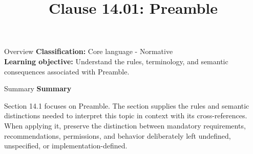 \documentclass[10pt,letterpaper]{article}
\title{Clause 14.01: Preamble}
\author{}
\date{}
\begin{document}
\maketitle
\begin{CornellOverviewBox}{Overview}
\textbf{Classification:} Core language - Normative\\[2pt]
\textbf{Learning objective:} Understand the rules, terminology, and semantic consequences associated with Preamble.
\end{CornellOverviewBox}\begin{CornellSummaryBox}{Summary}
{\sffamily\bfseries\color{Accent} Summary}\par\vspace{3pt}Section 14.1 focuses on Preamble. The section supplies the rules and semantic distinctions needed to interpret this topic in context with its cross-references. When applying it, preserve the distinction between mandatory requirements, recommendations, permissions, and behavior deliberately left undefined, unspecified, or implementation-defined.
\end{CornellSummaryBox}
\end{document}
